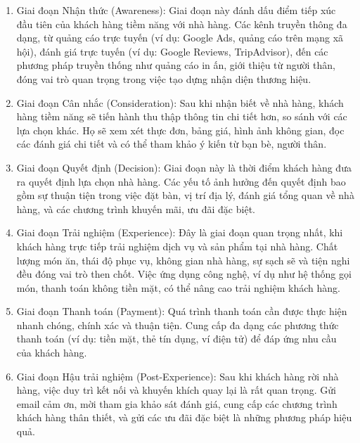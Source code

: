 \begin{enumerate}
	\item Giai đoạn Nhận thức (Awareness): Giai đoạn này đánh dấu điểm tiếp xúc đầu tiên của khách hàng tiềm năng với nhà hàng. Các kênh truyền thông đa dạng, từ quảng cáo trực tuyến (ví dụ: Google Ads, quảng cáo trên mạng xã hội), đánh giá trực tuyến (ví dụ: Google Reviews, TripAdvisor), đến các phương pháp truyền thống như quảng cáo in ấn, giới thiệu từ người thân, đóng vai trò quan trọng trong việc tạo dựng nhận diện thương hiệu.
	\item Giai đoạn Cân nhắc (Consideration): Sau khi nhận biết về nhà hàng, khách hàng tiềm năng sẽ tiến hành thu thập thông tin chi tiết hơn, so sánh với các lựa chọn khác. Họ sẽ xem xét thực đơn, bảng giá, hình ảnh không gian, đọc các đánh giá chi tiết và có thể tham khảo ý kiến từ bạn bè, người thân.
	\item Giai đoạn Quyết định (Decision): Giai đoạn này là thời điểm khách hàng đưa ra quyết định lựa chọn nhà hàng. Các yếu tố ảnh hưởng đến quyết định bao gồm sự thuận tiện trong việc đặt bàn, vị trí địa lý, đánh giá tổng quan về nhà hàng, và các chương trình khuyến mãi, ưu đãi đặc biệt.
	\item Giai đoạn Trải nghiệm (Experience): Đây là giai đoạn quan trọng nhất, khi khách hàng trực tiếp trải nghiệm dịch vụ và sản phẩm tại nhà hàng. Chất lượng món ăn, thái độ phục vụ, không gian nhà hàng, sự sạch sẽ và tiện nghi đều đóng vai trò then chốt. Việc ứng dụng công nghệ, ví dụ như hệ thống gọi món, thanh toán không tiền mặt, có thể nâng cao trải nghiệm khách hàng.
	\item Giai đoạn Thanh toán (Payment): Quá trình thanh toán cần được thực hiện nhanh chóng, chính xác và thuận tiện. Cung cấp đa dạng các phương thức thanh toán (ví dụ: tiền mặt, thẻ tín dụng, ví điện tử) để đáp ứng nhu cầu của khách hàng.
	\item Giai đoạn Hậu trải nghiệm (Post-Experience): Sau khi khách hàng rời nhà hàng, việc duy trì kết nối và khuyến khích quay lại là rất quan trọng. Gửi email cảm ơn, mời tham gia khảo sát đánh giá, cung cấp các chương trình khách hàng thân thiết, và gửi các ưu đãi đặc biệt là những phương pháp hiệu quả.
\end{enumerate}


